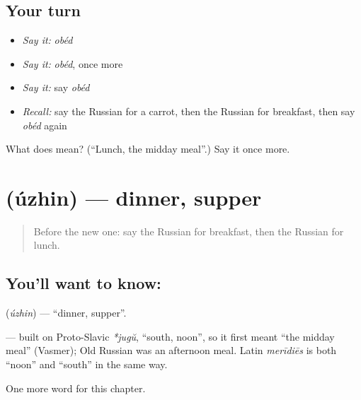\subsection*{Your turn}
\begin{itemize}
\raggedright
  \item \emph{Say it:} \emph{obéd}
  \item \emph{Say it:} \emph{obéd}, once more
  \item \emph{Say it:} say \emph{obéd}
  \item \emph{Recall:} say the Russian for a carrot, then the Russian for breakfast, then say \emph{obéd} again
\end{itemize}

\begin{tcolorbox}[breakable,colback=teal!4,colframe=teal!35!black,title={Before you move on}]
What does  mean? (\textquotedblleft{}Lunch, the midday meal\textquotedblright{}.) Say it once more.
\end{tcolorbox}
\section[\texorpdfstring{\ru{ужин} (úzhin)}{ужин (úzhin)}]{ (úzhin) — dinner, supper}

\label{lesson:RU-C46-dinner}



\begin{quote}
Before the new one: say the Russian for breakfast, then the Russian for lunch.
\end{quote}

\subsection*{You'll want to know: }
\textbf{} (\emph{úzhin}) — \textquotedblleft{}dinner, supper\textquotedblright{}.

\begin{cousinweb}
\textbf{} — built on Proto-Slavic \emph{*jugŭ}, \textquotedblleft{}south, noon\textquotedblright{}, so it first meant \textquotedblleft{}the midday meal\textquotedblright{} (Vasmer); Old Russian \emph{} was an afternoon meal. Latin \emph{merīdiēs} is both \textquotedblleft{}noon\textquotedblright{} and \textquotedblleft{}south\textquotedblright{} in the same way.
\end{cousinweb}

\begin{grammarlens}[title={What you've built}]
One more word for this chapter.
\end{grammarlens}

